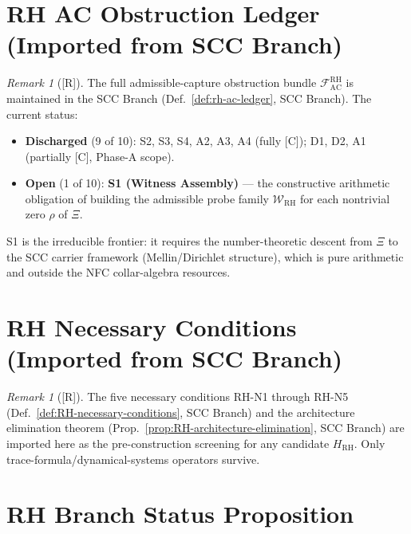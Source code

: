 \documentclass[12pt,oneside]{amsbook}
\theoremstyle{plain}
\theoremstyle{definition}
\theoremstyle{remark}
\newtheorem{remark}[theorem]{Remark}
\newcommand{\status}[1]{\textup{[#1]}}
\begin{document}
\section{RH AC Obstruction Ledger (Imported from SCC Branch)}
\label{sec:rh-ac-ledger}

\begin{remark}[\status{R}]
The full admissible-capture obstruction bundle
$\mathcal{F}^{\mathrm{RH}}_{\mathrm{AC}}$ is maintained in the
SCC Branch (Def.~\ref{def:rh-ac-ledger}, SCC Branch). The current
status:
\begin{itemize}
 \item \textbf{Discharged} (9 of 10): S2, S3, S4, A2, A3, A4
 (fully [C]); D1, D2, A1 (partially [C], Phase-A scope).
 \item \textbf{Open} (1 of 10): \textbf{S1 (Witness Assembly)}
 --- the constructive arithmetic obligation of building the
 admissible probe family $\mathcal{W}_{\mathrm{RH}}$ for each
 nontrivial zero $\rho$ of $\Xi$.
\end{itemize}
S1 is the irreducible frontier: it requires the number-theoretic
descent from $\Xi$ to the SCC carrier framework (Mellin/Dirichlet
structure), which is pure arithmetic and outside the NFC
collar-algebra resources.
\end{remark}

\section{RH Necessary Conditions (Imported from SCC Branch)}
\label{sec:rh-screening}

\begin{remark}[\status{R}]
The five necessary conditions RH-N1 through RH-N5
(Def.~\ref{def:RH-necessary-conditions}, SCC Branch) and the
architecture elimination theorem
(Prop.~\ref{prop:RH-architecture-elimination}, SCC Branch)
are imported here as the pre-construction screening for any
candidate $H_{\mathrm{RH}}$. Only trace-formula/dynamical-systems
operators survive.
\end{remark}

\section{RH Branch Status Proposition}
\label{sec:rh-status}
\end{document}
